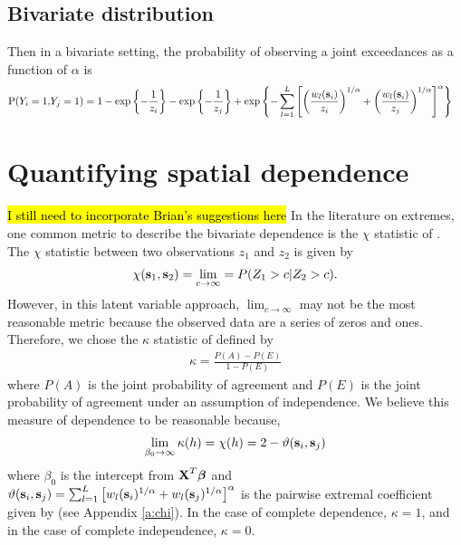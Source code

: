 \documentclass[11pt]{article}
\begin{document}
\subsection{Bivariate distribution}\label{s:bivariate}
Then in a bivariate setting, the probability of observing a joint exceedances as a function of $\alpha$ is
\begin{align} \label{biv}
  \text{P}(Y_i = 1, & Y_j = 1) = 1 - \exp\left\{ - \frac{ 1 }{ z_i } \right\} - \exp \left\{ - \frac{ 1 }{z_j} \right\} + \exp \left\{ - \sum_{ l = 1 }^{ L } \left[ \left( \frac{ w_{ l }(\mbox{\bf s}_i) }{ z_i } \right)^{1/\alpha} + \left( \frac{ w_{l }(\mbox{\bf s}_i)}{z_j} \right)^{1/\alpha} \right]^{\alpha} \right\}
\end{align}

\section{Quantifying spatial dependence}
\hl{I still need to incorporate Brian's suggestions here}
In the literature on extremes, one common metric to describe the bivariate dependence is the $\chi$ statistic of \citet{Coles1999}.
The $\chi$ statistic between two observations $z_1$ and $z_2$ is given by
\begin{align}
  \chi(\mbox{\bf s}_1, \mbox{\bf s}_2) = \lim_{c \rightarrow \infty} = P(Z_1 > c | Z_2 > c).
\end{align}
However, in this latent variable approach, $\lim_{c \rightarrow \infty}$ may not be the most reasonable metric because the observed data are a series of zeros and ones.
Therefore, we chose the $\kappa$ statistic of \citet{Cohen1960} defined by
\begin{align}
  \kappa = \frac{P(A) - P(E)}{1 - P(E)}
\end{align}
where $P(A)$ is the joint probability of agreement and $P(E)$ is the joint probability of agreement under an assumption of independence.
We believe this measure of dependence to be reasonable because,
\begin{align}
  \lim_{\beta_0 \rightarrow \infty} \kappa(h) = \chi(h) = 2 - \vartheta(\mbox{\bf s}_i, \mbox{\bf s}_j)
\end{align}
where $\beta_0$ is the intercept from $\mbox{\bf X}^T\mbox{\boldmath $\beta$}$ and $\vartheta (\mbox{\bf s}_i, \mbox{\bf s}_j) = \sum_{ l = 1 }^{ L } \left[ w_{l}(\mbox{\bf s}_i)^{ 1/\alpha } +  w_{ l}(\mbox{\bf s}_j)^{ 1/\alpha } \right]^\alpha$ is the pairwise extremal coefficient given by \citet{Reich2012} (see Appendix \ref{a:chi}).
In the case of complete dependence, $\kappa = 1$, and in the case of complete independence, $\kappa = 0$.
\end{document}
